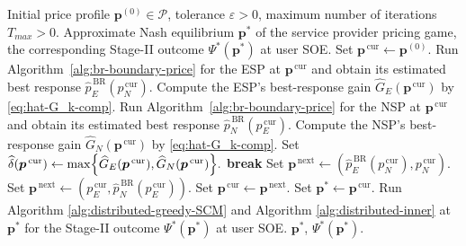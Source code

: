 \documentclass[lettersize,journal]{IEEEtran}
\begin{document}
\begin{algorithm}[t!] 
\caption{Iterative Pricing Algorithm for the Stage-I Pricing Game} 
\label{alg:br_dynamics} 
\begin{algorithmic}[1] 
\REQUIRE Initial price profile $\boldsymbol{p}^{(0)}\in \mathcal{P}$, tolerance $\varepsilon>0$, maximum number of iterations $T_{max}>0$. 
\ENSURE Approximate Nash equilibrium $\boldsymbol{p}^*$ of the service provider pricing game, the corresponding Stage-II outcome  $\Psi^*(\boldsymbol{p}^*)$ at user SOE. 
\STATE Set $\boldsymbol{p}^{\,\mathrm{cur}}\gets \boldsymbol{p}^{(0)}$. 
    \STATE Run Algorithm~\ref{alg:br-boundary-price} for the ESP at $\boldsymbol{p}^{\,\mathrm{cur}}$ and obtain its estimated best response $\widehat{p}^{\,\mathrm{BR}}_E(p^{\,\mathrm{cur}}_N)$.
    \STATE Compute the ESP's best-response gain $\widehat{G}_E(\boldsymbol{p}^{\,\mathrm{cur}})$ by \eqref{eq:hat-G_k-comp}. 
    \STATE Run Algorithm~\ref{alg:br-boundary-price} for the NSP at $\boldsymbol{p}^{\,\mathrm{cur}}$ and obtain its estimated best response $\widehat{p}^{\,\mathrm{BR}}_N(p^{\,\mathrm{cur}}_E)$.
    \STATE Compute the NSP's best-response gain $\widehat{G}_N(\boldsymbol{p}^{\,\mathrm{cur}})$ by \eqref{eq:hat-G_k-comp}.
    \STATE Set \( \widehat{\delta}(\boldsymbol{p}^{\,\mathrm{cur}}) \gets \max\Bigl\{ \widehat{G}_E(\boldsymbol{p}^{\,\mathrm{cur}}), \widehat{G}_N(\boldsymbol{p}^{\,\mathrm{cur}}) \Bigr\}. \)  
        \STATE \textbf{break} 
    \ENDIF 
        \STATE Set $\boldsymbol{p}^{\,\mathrm{next}}\gets(\widehat{p}^{\,\mathrm{BR}}_E(p^{\,\mathrm{cur}}_N),p^{\,\mathrm{cur}}_N)$.
    \ELSE
        \STATE Set $\boldsymbol{p}^{\,\mathrm{next}}\gets(p^{\,\mathrm{cur}}_E,\widehat{p}^{\,\mathrm{BR}}_N(p^{\,\mathrm{cur}}_E))$.
    \ENDIF
    \STATE Set $\boldsymbol{p}^{\,\mathrm{cur}}\gets \boldsymbol{p}^{\,\mathrm{next}}$. 
\ENDFOR 
\STATE Set $\boldsymbol{p}^*\gets \boldsymbol{p}^{\,\mathrm{cur}}$. 
\STATE Run Algorithm \ref{alg:distributed-greedy-SCM} and Algorithm \ref{alg:distributed-inner} at $\boldsymbol{p}^*$ for the Stage-II outcome $\Psi^*(\boldsymbol{p}^*)$ at user SOE.
\RETURN $\boldsymbol{p}^*$, $\Psi^*(\boldsymbol{p}^*)$. 
\end{algorithmic} 
\end{algorithm}
\end{document}
